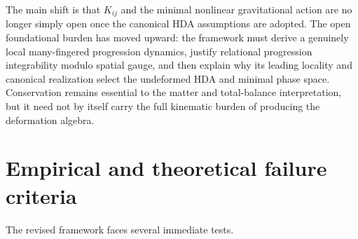 \documentclass[11pt]{article}
\begin{document}
The main shift is that $K_{ij}$ and the minimal nonlinear gravitational action are no longer simply open once the canonical HDA assumptions are adopted. The open foundational burden has moved upward: the framework must derive a genuinely local many-fingered progression dynamics, justify relational progression integrability modulo spatial gauge, and then explain why its leading locality and canonical realization select the undeformed HDA and minimal phase space. Conservation remains essential to the matter and total-balance interpretation, but it need not by itself carry the full kinematic burden of producing the deformation algebra.

\section{Empirical and theoretical failure criteria}

The revised framework faces several immediate tests.
\end{document}
